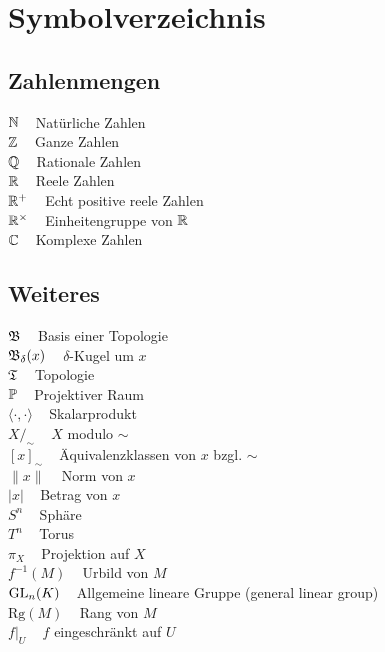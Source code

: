 \chapter*{Symbolverzeichnis}
\begin{minipage}[t]{0.45\textwidth}
\section*{Zahlenmengen}
$\mathbb{N}\;\;\;$ Natürliche Zahlen\\
$\mathbb{Z}\;\;\;$ Ganze Zahlen\\
$\mathbb{Q}\;\;\;$ Rationale Zahlen\\
$\mathbb{R}\;\;\;$ Reele Zahlen\\
$\mathbb{R}^+\;\;\;$ Echt positive reele Zahlen\\
$\mathbb{R}^\times\;\;\;$ Einheitengruppe von $\mathbb{R}$\\
$\mathbb{C}\;\;\;$ Komplexe Zahlen\\

\section*{Weiteres}
$\mathfrak{B}\;\;\;$ Basis einer Topologie\\
$\mathfrak{B}_\delta(x)\;\;\;$ $\delta$-Kugel um $x$\\
$\mathfrak{T}\;\;\;$ Topologie\\

$\mathbb{P}\;\;\;$ Projektiver Raum\\
$\langle \cdot , \cdot \rangle\;\;\;$ Skalarprodukt\\
$X /_\sim\;\;\;$ $X$ modulo $\sim$\\
$[x]_\sim\;\;\;$ Äquivalenzklassen von $x$ bzgl. $\sim$\\
$\| x \|\;\;\;$ Norm von $x$\\
$| x |\;\;\;$ Betrag von $x$\\
$S^n\;\;\;$ Sphäre\\
$T^n\;\;\;$ Torus\\
$\pi_X\;\;\;$ Projektion auf $X$\\
$f^{-1}(M)\;\;\;$ Urbild von $M$\\
$\mathrm{GL}_n(K)\;\;\;$ Allgemeine lineare Gruppe (general linear group)\\
$\text{Rg}(M)\;\;\;$ Rang von $M$\\
$f|_U\;\;\;$ $f$ eingeschränkt auf $U$\\

\end{minipage}

